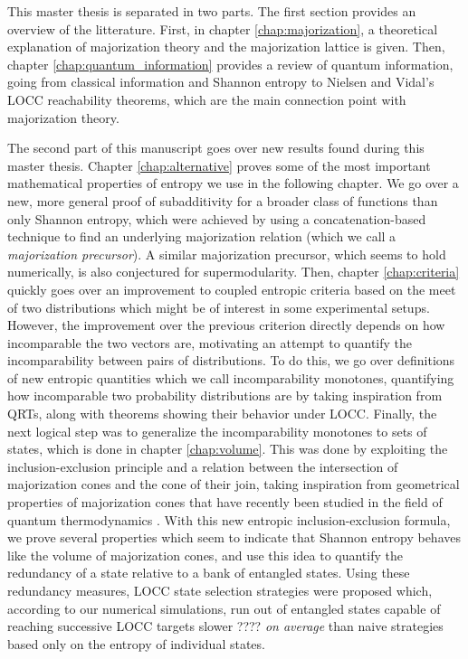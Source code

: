 This master thesis is separated in two parts. The first section provides an overview of the litterature. First, in chapter \ref{chap:majorization}, a theoretical explanation of majorization theory and the majorization lattice is given. Then, chapter \ref{chap:quantum_information} provides a review of quantum information, going from classical information and Shannon entropy to Nielsen and Vidal's LOCC reachability theorems, which are the main connection point with majorization theory.

The second part of this manuscript goes over new results found during this master thesis. Chapter \ref{chap:alternative} proves some of the most important mathematical properties of entropy we use in the following chapter. We go over a new, more general proof of subadditivity for a broader class of functions than only Shannon entropy, which were achieved by using a concatenation-based technique to find an underlying majorization relation (which we call a \textit{majorization precursor}). A similar majorization precursor, which seems to hold numerically, is also conjectured for supermodularity. Then, chapter \ref{chap:criteria} quickly goes over an improvement to coupled entropic criteria based on the meet of two distributions which might be of interest in some experimental setups. However, the improvement over the previous criterion directly depends on how incomparable the two vectors are, motivating an attempt to quantify the incomparability between pairs of distributions. To do this, we go over definitions of new entropic quantities which we call incomparability monotones, quantifying how incomparable two probability distributions are by taking inspiration from QRTs, along with theorems showing their behavior under LOCC. Finally, the next logical step was to generalize the incomparability monotones to sets of states, which is done in chapter \ref{chap:volume}. This was done by exploiting the inclusion-exclusion principle and a relation between the intersection of majorization cones and the cone of their join, taking inspiration from geometrical properties of majorization cones that have recently been studied in the field of quantum thermodynamics \cite{junior_geometric_2022}. With this new entropic inclusion-exclusion formula, we prove several properties which seem to indicate that Shannon entropy behaves like the volume of majorization cones, and use this idea to quantify the redundancy of a state relative to a bank of entangled states. Using these redundancy measures, LOCC state selection strategies were proposed which, according to our numerical simulations, run out of entangled states capable of reaching successive LOCC targets slower ???? \textit{on average} than naive strategies based only on the entropy of individual states.
